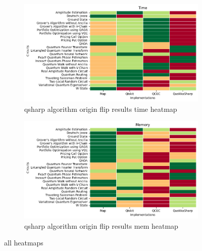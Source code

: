 
    \begin{figure}
    \centering
    \begin{subfigure}{.5\textwidth}
      \centering
      \includegraphics[width=1\linewidth]{benchmarks/./qsharp/all/algorithm/qsharp_algorithm_origin_flip_results_time_heatmap.png}
      \caption{qsharp algorithm origin flip results time heatmap}
      \label{fig:gensets_qsharp_algorithm_origin_flip_results_time_heatmap}
    \end{subfigure}
    \begin{subfigure}{.5\textwidth}
      \centering
      \includegraphics[width=1\linewidth]{benchmarks/./qsharp/all/algorithm/qsharp_algorithm_origin_flip_results_mem_heatmap.png}
      \caption{qsharp algorithm origin flip results mem heatmap}
      \label{fig:gensets_qsharp_algorithm_origin_flip_results_mem_heatmap}
    \end{subfigure}
    \caption{all heatmaps}
    \label{fig:gensets_qsharp_algorithm_origin_flip_results_heatmaps}
    \end{figure}
    
